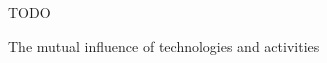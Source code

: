 \begin{figure}
  \centering
  TODO
  \caption{The mutual influence of technologies and activities \cite[p. 26]{benyon_14}}
  \label{fig:activities_and_technologies}
\end{figure}
